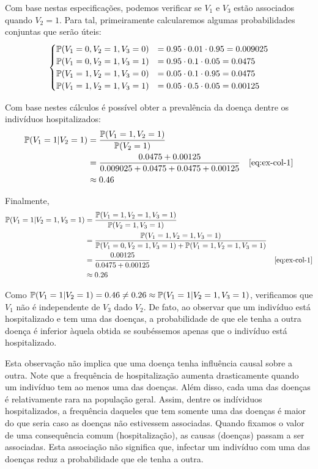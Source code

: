 Com base nestas especificações, podemos
verificar se $V_1$ e $V_3$ estão associados
quando $V_2=1$. Para tal,
primeiramente calcularemos algumas
probabilidades conjuntas que serão úteis:
\begin{align}
 \label{eq:ex-col-1}
 \begin{cases}
  \P(V_1=0,V_2=1,V_3=0) &= 0.95 \cdot 0.01 \cdot 0.95 = 0.009025 \\
  \P(V_1=0,V_2=1,V_3=1) &= 0.95 \cdot 0.1 \cdot 0.05 = 0.0475 \\
  \P(V_1=1,V_2=1,V_3=0) &= 0.05 \cdot 0.1 \cdot 0.95 = 0.0475 \\
  \P(V_1=1,V_2=1,V_3=1) &= 0.05 \cdot 0.5 \cdot 0.05 = 0.00125
 \end{cases}
\end{align}

Com base nestes cálculos é possível obter
a prevalência da doença dentre os indivíduos hospitalizados:
\begin{align*}
 \P(V_1=1|V_2=1) 
 &= \frac{\P(V_1=1,V_2=1)}{\P(V_2=1)} \\
 &= \frac{0.0475 + 0.00125}{0.009025 + 0.0475 + 0.0475 + 0.00125} 
 & \text{\cref{eq:ex-col-1}} \\
 &\approx 0.46
\end{align*}

Finalmente,
\begin{align*}
 \P(V_1 = 1|V_2 = 1, V_3 = 1)
 &= \frac{\P(V_1=1,V_2=1,V_3=1)}{\P(V_2=1,V_3=1)} \\
 &= \frac{\P(V_1=1,V_2=1,V_3=1)}
 {\P(V_1=0,V_2=1,V_3=1) + \P(V_1=1,V_2=1,V_3=1)} \\
 &= \frac{0.00125}{0.0475 + 0.00125} & \text{\cref{eq:ex-col-1}} \\
 &\approx 0.26 
\end{align*}

Como $\P(V_1=1|V_2=1) = 0.46 \neq 0.26 \approx \P(V_1=1|V_2=1,V_3=1)$,
verificamos que $V_1$ não é independente de $V_3$ dado $V_2$.
De fato, ao observar que um indivíduo está hospitalizado e
tem uma das doenças, a probabilidade de que ele tenha
a outra doença é inferior àquela obtida se soubéssemos apenas
que o indivíduo está hospitalizado.

Esta observação 
não implica que uma doença tenha influência causal sobre a outra.
Note que a frequência de hospitalização aumenta 
drasticamente quando um indivíduo tem ao menos uma das doenças.
Além disso, cada uma das doenças é relativamente rara na população geral.
Assim, dentre os indíviduos hospitalizados,
a frequência daqueles que tem somente uma das doenças é
maior do que seria caso as doenças não estivessem associadas.
Quando fixamos o valor de uma consequência comum (hospitalização),
as causas (doenças) passam a ser associadas.
Esta associação não significa que,
infectar um indivíduo com uma das doenças
reduz a probabilidade que ele tenha a outra.

